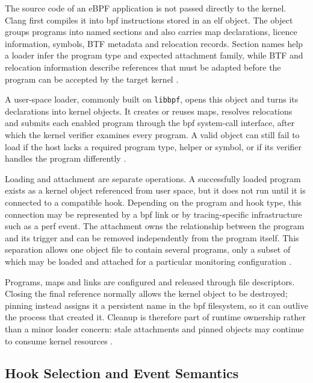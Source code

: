 The source code of an eBPF application is not passed directly to the kernel.
Clang first compiles it into \gls{bpf} instructions stored in an \gls{elf} object.
The object groups programs into named sections and also carries map
declarations, licence information, symbols, BTF metadata and relocation
records. Section names help a loader infer the program type and expected
attachment family, while BTF and relocation information describe references
that must be adapted before the program can be accepted by the target kernel
\cite{linux_libbpf_program_types,linux_btf,linux_bpf_llvm_relocations}.

A user-space loader, commonly built on \texttt{libbpf}, opens this object and
turns its declarations into kernel objects. It creates or reuses maps, resolves
relocations and submits each enabled program through the \gls{bpf} system-call
interface, after which the kernel verifier examines every program. A valid
object can still fail to load if the host lacks a required program type, helper
or symbol, or if its verifier handles the program differently
\cite{linux_bpf_syscall,linux_libbpf_overview,linux2026ebpfverifier}.

Loading and attachment are separate operations. A successfully loaded program
exists as a kernel object referenced from user space, but it does not run until
it is connected to a compatible hook. Depending on the program and hook type,
this connection may be represented by a \gls{bpf} link or by tracing-specific
infrastructure such as a perf event. The attachment owns the relationship
between the program and its trigger and can be removed independently from the
program itself. This separation allows one object file to contain several
programs, only a subset of which may be loaded and attached for a particular
monitoring configuration
\cite{linux_libbpf_program_types,linux_libbpf_overview}.

Programs, maps and links are configured and released through file descriptors.
Closing the final reference normally allows the kernel object to be destroyed;
pinning instead assigns it a persistent name in the \gls{bpf} filesystem, so it
can outlive the process that created it. Cleanup is therefore part of runtime
ownership rather than a minor loader concern: stale attachments and pinned
objects may continue to consume kernel resources
\cite{linux_bpf_syscall,linux_libbpf_overview}.

\subsection{Hook Selection and Event Semantics}
\label{subsec:ebpf-hook-selection-event-semantics}

